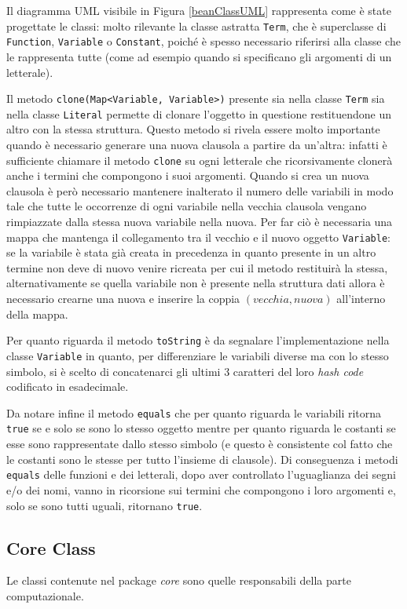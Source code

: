 \documentclass[a4paper,11pt]{article}
\begin{document}
Il diagramma UML visibile in Figura \ref{beanClassUML} rappresenta come è state progettate le classi: molto rilevante la classe astratta \texttt{Term}, che è superclasse di \texttt{Function}, \texttt{Variable} o \texttt{Constant}, poiché è spesso necessario riferirsi alla classe che le rappresenta tutte (come ad esempio quando si specificano gli argomenti di un letterale). \par
Il metodo \texttt{clone(Map<Variable, Variable>)} presente sia nella classe \texttt{Term} sia nella classe \texttt{Literal} permette di clonare l'oggetto in questione restituendone un altro con la stessa struttura. Questo metodo si rivela essere molto importante quando è necessario generare una nuova clausola a partire da un'altra: infatti è sufficiente chiamare il metodo \texttt{clone} su ogni letterale che ricorsivamente clonerà anche i termini che compongono i suoi argomenti. Quando si crea un nuova clausola è però necessario mantenere inalterato il numero delle variabili in modo tale che tutte le occorrenze di ogni variabile nella vecchia clausola vengano rimpiazzate dalla stessa nuova variabile nella nuova. Per far ciò è necessaria una mappa che mantenga il collegamento tra il vecchio e il nuovo oggetto \texttt{Variable}: se la variabile è stata già creata in precedenza in quanto presente in un altro termine non deve di nuovo venire ricreata per cui il metodo restituirà la stessa,  alternativamente se quella variabile non è presente nella struttura dati allora è necessario crearne una nuova e inserire la coppia $(vecchia, nuova)$ all'interno della mappa.\par
Per quanto riguarda il metodo \texttt{toString} è da segnalare l'implementazione nella classe \texttt{Variable} in quanto, per differenziare le variabili diverse ma con lo stesso simbolo, si è scelto di concatenarci gli ultimi 3 caratteri del loro \emph{hash code} codificato in esadecimale.\par
Da notare infine il metodo \texttt{equals} che per quanto riguarda le variabili ritorna \texttt{true} se e solo se sono lo stesso oggetto mentre per quanto riguarda le costanti se esse sono rappresentate dallo stesso simbolo (e questo è consistente col fatto che le costanti sono le stesse per tutto l'insieme di clausole). Di conseguenza i metodi \texttt{equals} delle funzioni e dei letterali, dopo aver controllato l'uguaglianza dei segni e/o dei nomi, vanno in ricorsione sui termini che compongono i loro argomenti e, solo se sono tutti uguali, ritornano \texttt{true}.

\subsection{Core Class}
Le classi contenute nel package \emph{core} sono quelle responsabili della parte computazionale.
\end{document}
